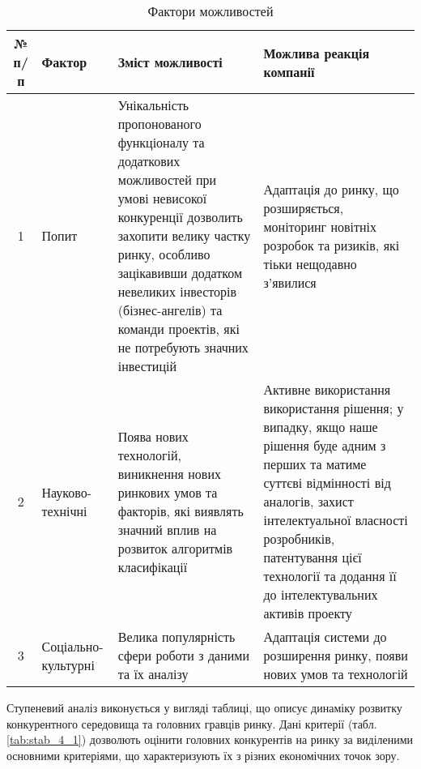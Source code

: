 \begin{table}[h!]
\fontsize{12pt}{12pt}\selectfont
	\begin{tabularx}{\textwidth}{|c|X|X|X|}
    \hline
    № п/п & Фактор & Зміст можливості & Можлива реакція компанії \\ \hline
    1 & Попит & Унікальність пропонованого функціоналу та додаткових можливостей при умові невисокої конкуренції дозволить захопити велику частку ринку, особливо зацікавивши додатком невеликих інвесторів (бізнес-ангелів) та команди проектів, які не потребують значних інвестицій & Адаптація до ринку, що розширяється, моніторинг новітніх розробок та ризиків, які тіьки нещодавно з'явилися \\ \hline
    2 & Науково-технічні & Поява нових технологій, виникнення нових ринкових умов та факторів, які виявлять значний вплив на розвиток алгоритмів класифікації  & Активне використання використання рішення; у випадку, якщо наше рішення буде адним з перших та матиме суттєві відмінності від аналогів, захист інтелектуальної власності розробників, патентування цієї технології та додання її до інтелектувальних активів проекту \\ \hline
    3 & Соціально-культурні & Велика популярність сфери роботи з даними та їх аналізу & Адаптація системи до розширення ринку, появи нових умов та технологій \\
    \hline
    \end{tabularx}
\caption{Фактори можливостей} \label{tab:stab_3}
\end{table}

Ступеневий аналіз виконується у вигляді таблиці, що описує динаміку розвитку конкурентного середовища та головних гравців ринку. Дані критерії (табл. \ref{tab:stab_4_1}) дозволють оцінити головних конкурентів на ринку за виділеними основними критеріями, що характеризують їх з різних економічних точок зору.

